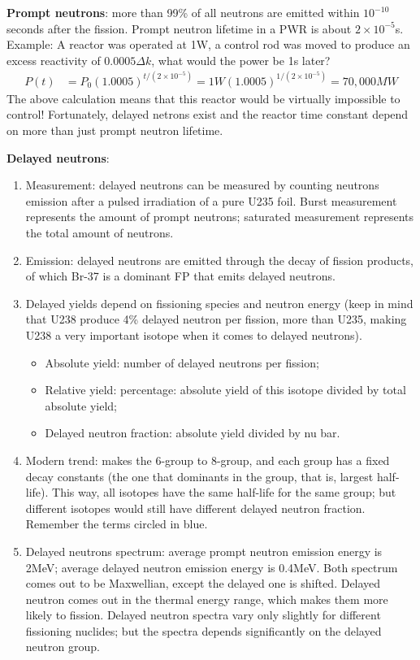 \documentclass{school-22.211-notes}
\date{April 25, 2012}
\begin{document}
\maketitle

\textbf{Prompt neutrons}: more than 99\% of all neutrons are emitted within $10^{-10}$ seconds after the fission. Prompt neutron lifetime in a PWR is about $2 \times 10^{-5}$s. Example: A reactor was operated at 1W, a control rod was moved to produce an excess reactivity of $0.0005 \Delta k$, what would the power be 1s later? 
\begin{align}
P(t) &= P_0 (1.0005)^{t/(2\times 10^{-5})} = 1 W (1.0005)^{1/(2\times 10^{-5})} = 70,000 MW 
\end{align}
The above calculation means that this reactor would be virtually impossible to control! Fortunately, delayed netrons exist and the reactor time constant depend on more than just prompt neutron lifetime. 

\textbf{Delayed neutrons}:
\begin{enumerate}
\item Measurement: delayed neutrons can be measured by counting neutrons emission after a pulsed irradiation of a pure U235 foil. Burst measurement represents the amount of prompt neutrons; saturated measurement represents the total amount of neutrons. 
\item Emission: delayed neutrons are emitted through the decay of fission products, of which Br-37 is a dominant FP that emits delayed neutrons. 
\item Delayed yields depend on fissioning species and neutron energy (keep in mind that U238 produce 4\% delayed neutron per fission, more than U235, making U238 a very important isotope when it comes to delayed neutrons). 
  \begin{itemize}
  \item Absolute yield: number of delayed neutrons per fission; 
  \item Relative yield: percentage: absolute yield of this isotope divided by total absolute yield; 
  \item Delayed neutron fraction: absolute yield divided by nu bar.  
  \end{itemize}
\item Modern trend: makes the 6-group to 8-group, and each group has a fixed decay constants (the one that dominants in the group, that is, largest half-life). This way, all isotopes have the same half-life for the same group; but different isotopes would still have different delayed neutron fraction. Remember the terms circled in blue.  
\item Delayed neutrons spectrum: average prompt neutron emission energy is 2MeV; average delayed neutron emission energy is 0.4MeV. Both spectrum comes out to be Maxwellian, except the delayed one is shifted. Delayed neutron comes out in the thermal energy range, which makes them more likely to fission. Delayed neutron spectra vary only slightly for different fissioning nuclides; but the spectra depends significantly on the delayed neutron group. 
\end{enumerate}
\end{document}

